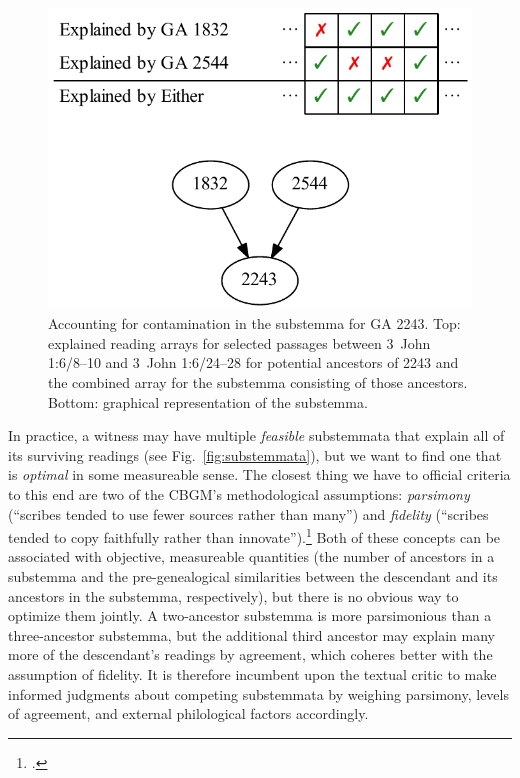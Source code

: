 \documentclass[a4paper, 12pt]{article}
\begin{document}
	\begin{figure}[h!]
		\centering
		\includegraphics[scale=0.6666]{../graphics/contamination.pdf}
		\caption{Accounting for contamination in the substemma for GA 2243. Top: explained reading arrays for selected passages between 3~John 1:6/8–10 and 3~John 1:6/24–28 for potential ancestors of 2243 and the combined array for the substemma consisting of those ancestors. Bottom: graphical representation of the substemma.}
		\label{fig:contamination}
	\end{figure}
	
	In practice, a witness may have multiple \emph{feasible} substemmata that explain all of its surviving readings (see Fig.~\ref{fig:substemmata}), but we want to find one that is \emph{optimal} in some measureable sense. The closest thing we have to official criteria to this end are two of the CBGM's methodological assumptions: \emph{parsimony} (``scribes tended to use fewer sources rather than many'') and \emph{fidelity} (``scribes tended to copy faithfully rather than innovate'').\footnote{\cite[98--99]{WG17}.} Both of these concepts can be associated with objective, measureable quantities (the number of ancestors in a substemma and the pre-genealogical similarities between the descendant and its ancestors in the substemma, respectively), but there is no obvious way to optimize them jointly. A two-ancestor substemma is more parsimonious than a three-ancestor substemma, but the additional third ancestor may explain many more of the descendant's readings by agreement, which coheres better with the assumption of fidelity. It is therefore incumbent upon the textual critic to make informed judgments about competing substemmata by weighing parsimony, levels of agreement, and external philological factors accordingly.
	
\end{document}
